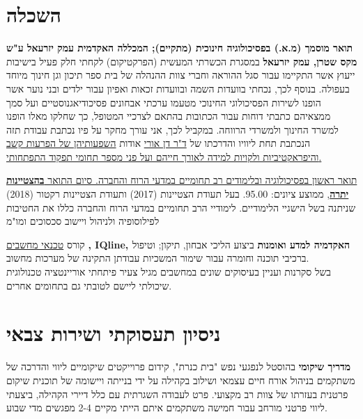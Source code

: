 \section{השכלה}

{\textbf{תואר מוסמך (מ.א.) בפסיכולוגיה חינוכית (מתקיים); המכללה האקדמית עמק יזרעאל ע"ש מקס שטרן, עמק יזרעאל}}
{במסגרת הכשרתי המעשית (הפרקטיקום) לקחתי חלק פעיל בישיבות ייעוץ אשר התקיימו עבור סגל ההוראה וחברי צוות ההנהלה של בית ספר תיכון וגן חינוך מיוחד בעפולה. בנוסף לכך, נכחתי בוועדות השמה ובוועדות זכאות ואפיון עבור ילדים ובני נוער אשר הופנו לשירות הפסיכולוגי החינוכי מטעמו  ערכתי אבחונים פסיכודיאגנוסטיים ועל סמך ממצאיהם כתבתי דוחות עבור הכתובות בהתאם לצרכיי המטופל, כך שחלקו מאלו הופנו למשרד החינוך ולמשרדי הרווחה. 
	במקביל לכך, אני עורך מחקר על פיו נכתבת עבודת תזה הנכתבת תחת ליוויו והדרכתו של 
	\href{https://www.researchgate.net/scientific-contributions/Orrie-Dan-2172412162}{ד"ר דן אורי} אודות 
	\href{https://tinyurl.com/ADHD-Coping-Seminar}{השפעותיהן של הפרעות קשב והיפראקטיביות ולקויות למידה לאורך חייהם ועל פני מספר תחומי תפקוד התפתחותי.}}
{}

{\href{https://www.dropbox.com/s/pcm0mybvgi85ma0/BA-Psych.pdf}{תואר ראשון בפסיכולוגיה ובלימודים רב תחומיים במדעי הרוח והחברה. סיום התואר \textbf{בהצטיינות יתרה}}, ממוצע ציונים: 95.00.}
{בעל תעודת הצטיינות (2017) ותעודת הצטיינות רקטור (2018) שניתנה בשל הישגיי הלימודיים.}
{לימודיי הרב תחומיים במדעי הרוח והחברה כללו את החטיבות לפילוסופיה ולניהול ויישוב סכסוכים ומו"מ}

\par{\par}

 {קורס
\href{https://www.dropbox.com/s/csphxdynjdg3ze2/computer-technitian-certificate.jpg}{טכנאי מחשבים}
		\textbf{, IQline, האקדמיה למדע ואומנות}}
{ביצוע הליכי אבחון, תיקון; וטיפול ברכיבי תוכנה וחומרה עבור שימור המשכיות עבודתן התקינה של מערכות מחשוב. \\
בשל סקרנות ועניין בעיסוקים שונים במחשבים מגיל צעיר פיתחתי אוריינטציה טכנולוגית שיכולתי ליישם לטובתי גם בתחומים אחרים.}
{}
{}

\section{ניסיון תעסוקתי ושירות צבאי}

{\textbf{מדריך שיקומי}  בהוסטל לנפגעי נפש "בית כנרת", קידום פרוייקטים שיקומיים}
{ליווי והדרכה של משתקמים בניהול אורח חיים עצמאי ושילוב בקהילה על ידי בנייתה ויישומה של תוכנית שיקום פרטנית בעזרתו של צוות רב מקצועי. פרט לעבודה השגרתית עם כלל דיירי הקהילה, ביצעתי ליווי פרטני מורחב עבור חמישה משתקמים איתם הייתי מקיים 2-4 מפגשים מדי שבוע.}
{}

